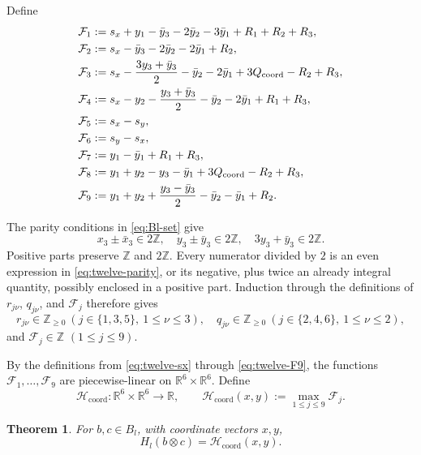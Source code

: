 \documentclass[11pt,reqno]{amsart}
\newcommand{\Zge}{\mathbb Z_{\ge 0}}
\numberwithin{table}{section}
\numberwithin{equation}{section}
\theoremstyle{plain}
\newtheorem{theorem}{Theorem}[section]
\theoremstyle{definition}
\begin{document}
Define
\begin{align}
	\mathcal F_1
	&:=
	s_x+y_1-\bar y_3-2\bar y_2-3\bar y_1
	+R_1+R_2+R_3,
	\label{eq:twelve-F1}\\
	\mathcal F_2
	&:=
	s_x-\bar y_3-2\bar y_2-2\bar y_1+R_2,
	\notag\\
	\mathcal F_3
	&:=
	s_x-\frac{3y_3+\bar y_3}{2}
	-\bar y_2-2\bar y_1
	+3Q_{\mathrm{coord}}-R_2+R_3,
	\notag\\
	\mathcal F_4
	&:=
	s_x-y_2-\frac{y_3+\bar y_3}{2}
	-\bar y_2-2\bar y_1
	+R_1+R_3,
	\notag\\
	\mathcal F_5
	&:=
	s_x-s_y,
	\notag\\
	\mathcal F_6
	&:=
	s_y-s_x,
	\notag\\
	\mathcal F_7
	&:=
	y_1-\bar y_1+R_1+R_3,
	\notag\\
	\mathcal F_8
	&:=
	y_1+y_2-y_3-\bar y_1
	+3Q_{\mathrm{coord}}-R_2+R_3,
	\notag\\
	\mathcal F_9
	&:=
	y_1+y_2+\frac{y_3-\bar y_3}{2}
	-\bar y_2-\bar y_1+R_2.
	\label{eq:twelve-F9}
\end{align}

The parity conditions in \eqref{eq:Bl-set} give
\begin{equation}\label{eq:twelve-parity}
	x_3\pm\bar x_3\in2\mathbb Z,
	\quad
	y_3\pm\bar y_3\in2\mathbb Z,
	\quad
	3y_3+\bar y_3\in2\mathbb Z.
\end{equation}
Positive parts preserve \(\mathbb Z\) and \(2\mathbb Z\).
Every numerator divided by \(2\) is an even expression in
\eqref{eq:twelve-parity}, or its negative, plus twice an
already integral quantity, possibly enclosed in a positive part.
Induction through the definitions of \(r_{j\nu}\), \(q_{j\nu}\), and \(\mathcal F_j\) therefore gives
\[
r_{j\nu}\in\Zge
\ (j\in\{1,3,5\},\ 1\le\nu\le3),
\quad
q_{j\nu}\in\Zge
\ (j\in\{2,4,6\},\ 1\le\nu\le2),
\]
and $\mathcal F_j\in\mathbb Z$ $(1\le j\le9)$.

By the definitions from \eqref{eq:twelve-sx} through
\eqref{eq:twelve-F9}, the functions
\(\mathcal F_1,\ldots,\mathcal F_9\) are piecewise-linear on
\(\mathbb R^6\times\mathbb R^6\).
Define
\begin{equation}\label{eq:direct-coordinate-H}
	\mathscr H_{\mathrm{coord}}:
	\mathbb R^6\times\mathbb R^6
	\longrightarrow\mathbb R,
	\qquad
	\mathscr H_{\mathrm{coord}}(x,y)
	:=
	\max_{1\le j\le9}\mathcal F_j.
\end{equation}

\begin{theorem}
	\label{thm:twelve-coordinate-energy}
	For \(b,c\in B_l\), with coordinate vectors \(x,y\),
	\begin{equation}\label{eq:twelve-coordinate-energy}
		H_l(b\otimes c)
		=
		\mathscr H_{\mathrm{coord}}(x,y).
	\end{equation}
\end{theorem}
\end{document}
